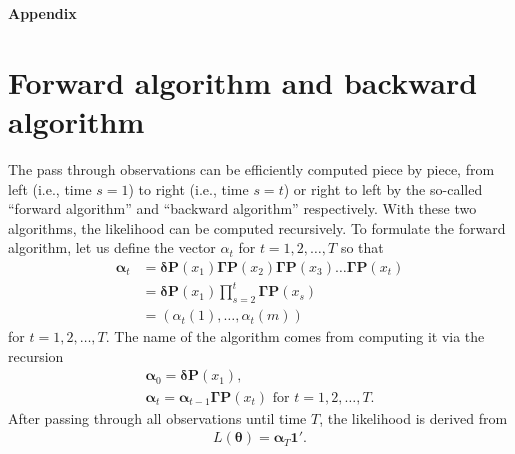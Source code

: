 \documentclass[]{interact}\usepackage[]{graphicx}\usepackage[dvipsnames]{xcolor}
\theoremstyle{plain}%
\theoremstyle{definition}
\theoremstyle{remark}
\begin{document}
\clearpage
\appendix

\begin{center}
  {\bf \Huge Appendix}
\end{center}


\section{Forward algorithm and backward algorithm}
\label{sec:appendix-hmm_fwbw}

The pass through observations can be efficiently computed piece by piece, from left (i.e., time $s=1$) to right (i.e., time $s=t$) or right to left by the so-called ``forward algorithm'' and ``backward algorithm'' respectively. With these two algorithms, the likelihood can be computed recursively. To formulate the forward algorithm, let us define the vector $\alpha_t$ for $t = 1, 2, \ldots, T$ so that
\begin{align*}
\bm{\alpha}_t &= \bm{\delta} \bm{P}(x_1)\bm{\Gamma} \bm{P}(x_2) \bm{\Gamma} \bm{P}(x_3) \ldots \bm{\Gamma} \bm{P}(x_t)\\
&= \bm{\delta} \bm{P}(x_1) \prod_{s=2}^{t}\bm{\Gamma} \bm{P}(x_s)\\
&= \left( \alpha_t(1), \ldots, \alpha_t(m) \right)
\end{align*}
for $t = 1, 2, \ldots, T$.
The name of the algorithm comes from computing it via the recursion
\begin{gather*}
\bm{\alpha}_0 = \bm{\delta} \bm{P}(x_1),\\
\bm{\alpha}_t = \bm{\alpha}_{t-1} \bm{\Gamma} \bm{P}(x_t) \text{ for } t = 1, 2, \ldots, T.
\end{gather*}
After passing through all observations until time $T$, the likelihood is derived from
\begin{gather*}
L(\bm{\theta}) = \bm{\alpha}_T \bm{1}'.
\end{gather*}
\end{document}
